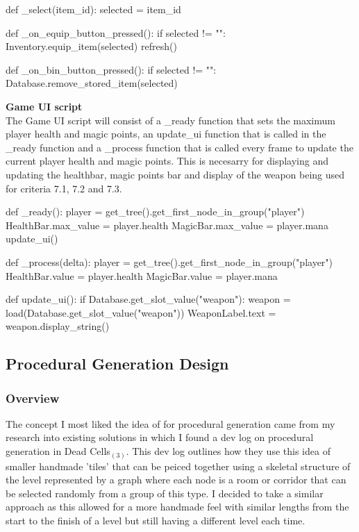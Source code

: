 \documentclass{article}
\begin{document}
        \begin{python}
def _select(item_id):
   selected = item_id
        
def _on_equip_button_pressed():
   if selected != "":
      Inventory.equip_item(selected)
      refresh()
        
def _on_bin_button_pressed():
   if selected != "":
      Database.remove_stored_item(selected)
        \end{python}
        \textbf{Game UI script}\\
        The Game UI script will consist of a \_ready function that sets the maximum player health and magic points, an update\_ui function that is called in the \_ready function and a \_process function that is called every frame to update the current player health and magic points. This is necesarry for displaying and updating the healthbar, magic points bar and display of the weapon being used for criteria 7.1, 7.2 and 7.3.\\
        \begin{python}
def _ready():
   player = get_tree().get_first_node_in_group("player")
   HealthBar.max_value = player.health
   MagicBar.max_value = player.mana
   update_ui()
                
def _process(delta):
   player = get_tree().get_first_node_in_group("player")
   HealthBar.value = player.health
   MagicBar.value = player.mana
        
def update_ui():
   if Database.get_slot_value("weapon"):
      weapon = load(Database.get_slot_value("weapon"))
      WeaponLabel.text = weapon.display_string()
        \end{python}

        \subsection{Procedural Generation Design}
        \subsubsection{Overview}
        The concept I most liked the idea of for procedural generation came from my research into existing solutions in which I found a dev log on procedural generation in Dead Cells$_{(3)}$. This dev log outlines how they use this idea of smaller handmade 'tiles' that can be peiced together using a skeletal structure of the level represented by a graph where each node is a room or corridor that can be selected randomly from a group of this type. I decided to take a similar approach as this allowed for a more handmade feel with similar lengths from the start to the finish of a level but still having a different level each time.\\
\end{document}
